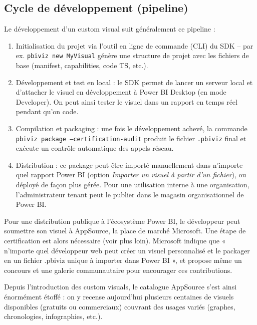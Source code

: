 \subsection*{Cycle de développement (pipeline)}
Le développement d’un custom visual suit généralement ce pipeline :
\begin{enumerate}
  \item Initialisation du projet via l’outil en ligne de commande (CLI) du SDK – par ex. \texttt{pbiviz new MyVisual} génère une structure de projet avec les fichiers de base (manifest, capabilities, code TS, etc.)\parencite{LearnMicrosoftSDK2}.
  \item Développement et test en local : le SDK permet de lancer un serveur local et d’attacher le visuel en développement à Power BI Desktop (en mode Developer). On peut ainsi tester le visuel dans un rapport en temps réel pendant qu’on code.
  \item Compilation et packaging : une fois le développement achevé, la commande \texttt{pbiviz package --certification-audit} produit le fichier \texttt{.pbiviz} final et exécute un contrôle automatique des appels réseau\parencite{MicrosoftAuditCLI2025}.
  \item Distribution : ce package peut être importé manuellement dans n’importe quel rapport Power BI (option \emph{Importer un visuel à partir d’un fichier}), ou déployé de façon plus gérée. Pour une utilisation interne à une organisation, l’administrateur tenant peut le publier dans le magasin organisationnel de Power BI\parencite{MicrosoftCertGuide2025}.
\end{enumerate}

Pour une distribution publique à l’écosystème Power BI, le développeur peut soumettre son visuel à AppSource, la place de marché Microsoft. Une étape de certification est alors nécessaire (voir plus loin). Microsoft indique que « n’importe quel développeur web peut créer un visuel personnalisé et le packager en un fichier .pbiviz unique à importer dans Power BI »\parencite{LearnMicrosoftSDK3}, et propose même un concours et une galerie communautaire pour encourager ces contributions\parencite{PowerBIMicrosoftCommunity}.

Depuis l’introduction des custom visuals, le catalogue AppSource s’est ainsi énormément étoffé : on y recense aujourd’hui plusieurs centaines de visuels disponibles (gratuits ou commerciaux) couvrant des usages variés (graphes, chronologies, infographies, etc.).

